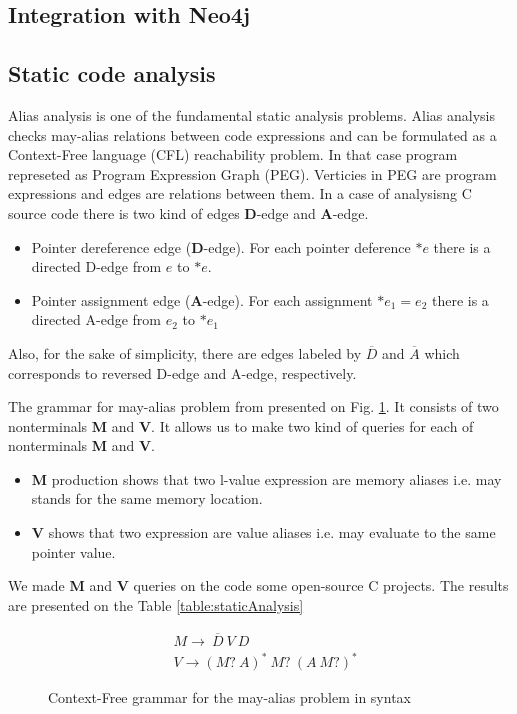 \subsection{Integration with Neo4j}

\subsection{Static code analysis}

Alias analysis is one of the fundamental static analysis problems\cite{Marlowe}. Alias analysis checks may-alias relations between code expressions and can be formulated as a Context-Free language (CFL) reachability problem\cite{Reps}. In that case program represeted as Program Expression Graph (PEG)\cite{Zheng}. Verticies in PEG are program expressions and edges are relations between them. In a case of analysisng C source code there is two kind of edges \textbf{D}-edge and \textbf{A}-edge.
\begin{itemize}
    \item Pointer dereference edge (\textbf{D}-edge). For each pointer deference $*e$ there is a directed D-edge from $e$ to $*e$.
    \item Pointer assignment edge (\textbf{A}-edge). For each assignment $*e_1=e_2$ there is a directed A-edge from $e_2$ to $*e_1$
\end{itemize}
Also, for the sake of simplicity, there are edges labeled by $\overline{D}$ and $\overline{A}$ which corresponds to reversed D-edge and A-edge, respectively.

The grammar for may-alias problem from \cite{Zheng} presented on Fig. \ref{lst:aliasGrammar}. It consists of two nonterminals \textbf{M} and \textbf{V}. It allows us to make two kind of queries for each of nonterminals \textbf{M} and \textbf{V}.
\begin{itemize}
    \item \textbf{M} production shows that two l-value expression are memory aliases i.e. may stands for the same memory location.
    \item \textbf{V} shows that two expression are value aliases i.e. may evaluate to the same pointer value.
\end{itemize}

We made \textbf{M} and \textbf{V} queries on the code some open-source C projects. The results are presented on the Table \ref{table:staticAnalysis} 

\begin{figure}[t]
\begin{align*}
& M \rightarrow\ \overline{D}\ V\ D\\
& V \rightarrow (M ?\ A)^{*} \ M?\ (A\ M?)^{*}
\end{align*}
\caption{Context-Free grammar for the may-alias problem in syntax}
\label{lst:aliasGrammar}
\end{figure}



